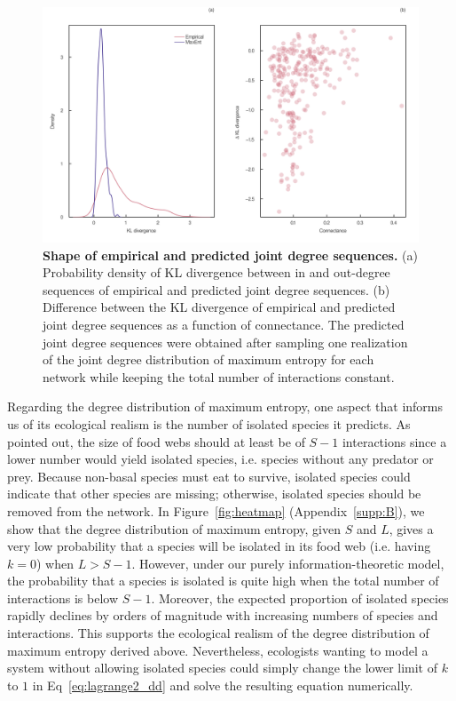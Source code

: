 \begin{figure}[!h]
  \centering
  \includegraphics[width=\textwidth]{figures/article2/kl_divergence.png}
  \caption{\textbf{Shape of empirical and predicted joint degree sequences.}
  (a) Probability density of KL divergence between in and out-degree sequences of
  empirical and predicted joint degree sequences. (b) Difference between the KL
  divergence of empirical and predicted joint degree sequences as a function of
  connectance. The predicted joint degree sequences were obtained after sampling
  one realization of the joint degree distribution of maximum entropy for each
  network while keeping the total number of interactions constant.}
\label{fig:kl_diverg}
\end{figure}

\clearpage

Regarding the degree distribution of maximum entropy, one aspect that informs us
of its ecological realism is the number of isolated species it predicts. As
\textcite{MacDonald2020Revisiting} pointed out, the size of food webs should at
least be of $S-1$ interactions since a lower number would yield isolated
species, i.e. species without any predator or prey. Because non-basal species
must eat to survive, isolated species could indicate that other species are
missing; otherwise, isolated species should be removed from the network. In
Figure~\ref{fig:heatmap} (Appendix~\ref{supp:B}), we show that the degree
distribution of maximum entropy, given $S$ and $L$, gives a very low probability
that a species will be isolated in its food web (i.e. having $k = 0$) when $L >
S-1$. However, under our purely information-theoretic model, the probability
that a species is isolated is quite high when the total number of interactions
is below $S-1$. Moreover, the expected proportion of isolated species rapidly
declines by orders of magnitude with increasing numbers of species and
interactions. This supports the ecological realism of the degree distribution of
maximum entropy derived above. Nevertheless, ecologists wanting to model a
system without allowing isolated species could simply change the lower limit of
$k$ to $1$ in Eq~\ref{eq:lagrange2_dd} and solve the resulting equation
numerically.

